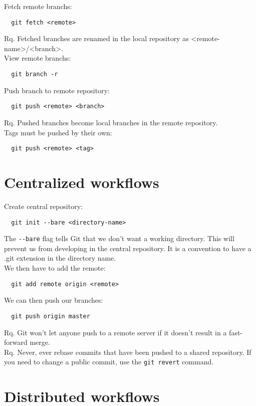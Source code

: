 \documentclass[french]{article}
\begin{document}
Fetch remote branchs:
\begin{verbatim}
  git fetch <remote>
\end{verbatim}
Rq. Fetched branches are renamed in the local repository as <remote-name>/<branch>.\\

View remote branchs:
\begin{verbatim}
  git branch -r
\end{verbatim}

Push branch to remote repository:
\begin{verbatim}
  git push <remote> <branch>
\end{verbatim}
Rq. \danger Pushed branches become local branches in the remote repository.\\

Tags must be pushed by their own:
\begin{verbatim}
  git push <remote> <tag>
\end{verbatim}

\section{Centralized workflows}

Create central repository:
\begin{verbatim}
  git init --bare <directory-name>
\end{verbatim}
The \verb|--bare| flag tells Git that we don't want a working directory. This will prevent us from developing in the central repository. It is a convention to have a .git extension in the directory name. \\

We then have to add the remote:
\begin{verbatim}
  git add remote origin <remote>
\end{verbatim}


We can then push our branches:
\begin{verbatim}
  git push origin master
\end{verbatim}

Rq. Git won't let anyone push to a remote server if it doesn't result in a fast-forward merge.\\

Rq. Never, ever rebase commits that have been pushed to a shared repository. If you need to change a public commit, use the \verb|git revert| command.

\section{Distributed workflows}
\end{document}
